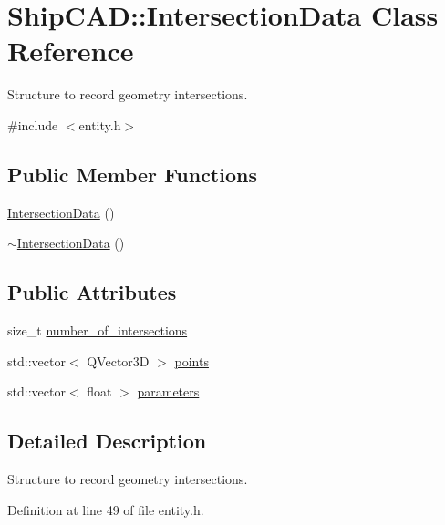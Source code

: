 \hypertarget{classShipCAD_1_1IntersectionData}{\section{Ship\-C\-A\-D\-:\-:Intersection\-Data Class Reference}
\label{classShipCAD_1_1IntersectionData}
}


Structure to record geometry intersections.  




{\ttfamily \#include $<$entity.\-h$>$}

\subsection*{Public Member Functions}
\begin{DoxyCompactItemize}
\item 
\hyperlink{classShipCAD_1_1IntersectionData_acc582d8820d6e60117e0bf5fe686ab76}{Intersection\-Data} ()
\item 
\hyperlink{classShipCAD_1_1IntersectionData_a80ee22151368715711e3713eae61d401}{$\sim$\-Intersection\-Data} ()
\end{DoxyCompactItemize}
\subsection*{Public Attributes}
\begin{DoxyCompactItemize}
\item 
size\-\_\-t \hyperlink{classShipCAD_1_1IntersectionData_a5b42e3b8b81d18963f9a07609b402628}{number\-\_\-of\-\_\-intersections}
\item 
std\-::vector$<$ Q\-Vector3\-D $>$ \hyperlink{classShipCAD_1_1IntersectionData_a926e126e42d95e01b39e2750a0e1fb95}{points}
\item 
std\-::vector$<$ float $>$ \hyperlink{classShipCAD_1_1IntersectionData_a06fcbb71243644bdea0e5b86da3b191c}{parameters}
\end{DoxyCompactItemize}


\subsection{Detailed Description}
Structure to record geometry intersections. 

Definition at line 49 of file entity.\-h.



